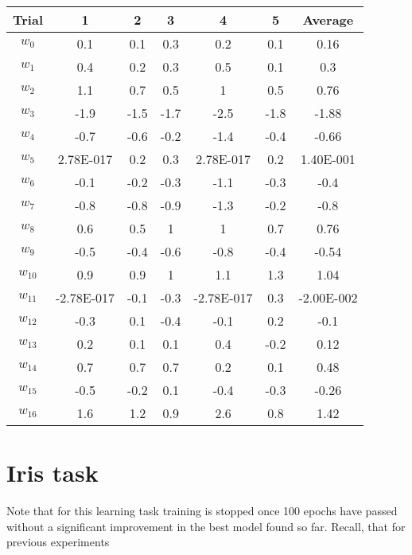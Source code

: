 \documentclass[12pt,letterpaper]{article}
\begin{document}
\begin{tabular}{ccccccc}
\toprule
Trial	&	1	&	2	&	3	&	4	&	5	&	Average\\
\hline
$w_0$	&	0.1	&	0.1	&	0.3	&	0.2	&	0.1	&	0.16\\
$w_1$	&	0.4	&	0.2	&	0.3	&	0.5	&	0.1	&	0.3\\
$w_2$	&	1.1	&	0.7	&	0.5	&	1	&	0.5	&	0.76\\
$w_3$	&	-1.9	&	-1.5	&	-1.7	&	-2.5	&	-1.8	&	-1.88\\
$w_4$	&	-0.7	&	-0.6	&	-0.2	&	-1.4	&	-0.4	&	-0.66\\
$w_5$	&	2.78E-017	&	0.2	&	0.3	&	2.78E-017	&	0.2	&	1.40E-001\\
$w_6$	&	-0.1	&	-0.2	&	-0.3	&	-1.1	&	-0.3	&	-0.4\\
$w_7$	&	-0.8	&	-0.8	&	-0.9	&	-1.3	&	-0.2	&	-0.8\\
$w_8$	&	0.6	&	0.5	&	1	&	1	&	0.7	&	0.76\\
$w_9$	&	-0.5	&	-0.4	&	-0.6	&	-0.8	&	-0.4	&	-0.54\\
$w_{10}$	&	0.9	&	0.9	&	1	&	1.1	&	1.3	&	1.04\\
$w_{11}$	&	-2.78E-017	&	-0.1	&	-0.3	&	-2.78E-017	&	0.3	&	-2.00E-002\\
$w_{12}$	&	-0.3	&	0.1	&	-0.4	&	-0.1	&	0.2	&	-0.1\\
$w_{13}$	&	0.2	&	0.1	&	0.1	&	0.4	&	-0.2	&	0.12\\
$w_{14}$	&	0.7	&	0.7	&	0.7	&	0.2	&	0.1	&	0.48\\
$w_{15}$	&	-0.5	&	-0.2	&	0.1	&	-0.4	&	-0.3	&	-0.26\\
$w_{16}$	&	1.6	&	1.2	&	0.9	&	2.6	&	0.8	&	1.42\\
\bottomrule
\end{tabular}



\section*{Iris task}

Note that for this learning task training is stopped once 100 epochs have passed without a significant improvement in the best model found so far. Recall, that for previous experiments  
\end{document}

